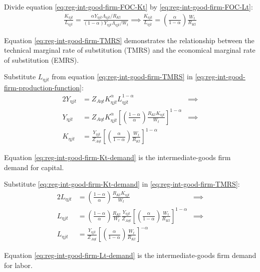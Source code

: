 \documentclass[../thesis.tex]{subfiles}
\begin{document}
Divide equation \ref{eq:reg-int-good-firm-FOC-Kt} by \ref{eq:reg-int-good-firm-FOC-Lt}:
\begin{align}
	\frac{K_{\eta jt}}{L_{\eta jt}} = \frac{{\alpha_{}} Y_{\eta jt} \Lambda_{\eta jt} /R_{Kt}}{(1-{\alpha_{}}) Y_{\eta jt} \Lambda_{\eta jt} /W_t} \implies
	\frac{K_{\eta jt}}{L_{\eta jt}} = \left( \frac{{\alpha_{}}}{1-{\alpha_{}}} \right) \frac{W_t}{R_{Kt}} \label{eq:reg-int-good-firm-TMRS}
\end{align}

Equation \ref{eq:reg-int-good-firm-TMRS} demonstrates the relationship between the technical marginal rate of substitution (TMRS) and the economical marginal rate of substitution (EMRS). 

Substitute $L_{\eta jt}$ from equation \ref{eq:reg-int-good-firm-TMRS} in \ref{eq:reg-int-good-firm-production-function}:
\begin{alignat}{2}
	Y_{\eta jt} & = Z_{A\eta t} K_{\eta jt}^{\alpha_{}} L_{\eta jt}^{1-{\alpha_{}}} &\implies \nonumber \\
	Y_{\eta jt} & = Z_{A\eta t} K_{\eta jt}^{\alpha_{}} \left[ \left( \frac{1-{\alpha_{}}}{{\alpha_{}}} \right) \frac{R_{Kt} K_{\eta jt}}{W_t} \right]^{1-{\alpha_{}}} &\implies \nonumber \\
	K_{\eta jt} & = \frac{Y_{\eta jt}}{Z_{A\eta t}} \left[ \left( \frac{{\alpha_{}}}{1-{\alpha_{}}} \right) \frac{W_t}{R_{Kt}}\right]^{1-{\alpha_{}}} \label{eq:reg-int-good-firm-Kt-demand}
\end{alignat}

Equation \ref{eq:reg-int-good-firm-Kt-demand} is the intermediate-goods firm demand for capital. 

Substitute \ref{eq:reg-int-good-firm-Kt-demand} in \ref{eq:reg-int-good-firm-TMRS}:
\begin{alignat}{2}
	L_{\eta jt} & = \left( \frac{1-{\alpha_{}}}{{\alpha_{}}} \right) \frac{R_{Kt} K_{\eta jt}}{W_t} &\implies \nonumber \\
	L_{\eta jt} & = \left( \frac{1-{\alpha_{}}}{{\alpha_{}}} \right) \frac{R_{Kt}}{W_t} \frac{Y_{\eta jt}}{Z_{A\eta t}} \left[ \left( \frac{{\alpha_{}}}{1-{\alpha_{}}} \right) \frac{W_t}{R_{Kt}}\right]^{1-{\alpha_{}}} &\implies \nonumber \\
	L_{\eta jt} & = \frac{Y_{\eta jt}}{Z_{A\eta t}} \left[ \left( \frac{{\alpha_{}}}{1-{\alpha_{}}} \right) \frac{W_t}{R_{Kt}}\right]^{-{\alpha_{}}} \label{eq:reg-int-good-firm-Lt-demand}
\end{alignat}

Equation \ref{eq:reg-int-good-firm-Lt-demand} is the intermediate-goods firm demand for labor.
\end{document}

